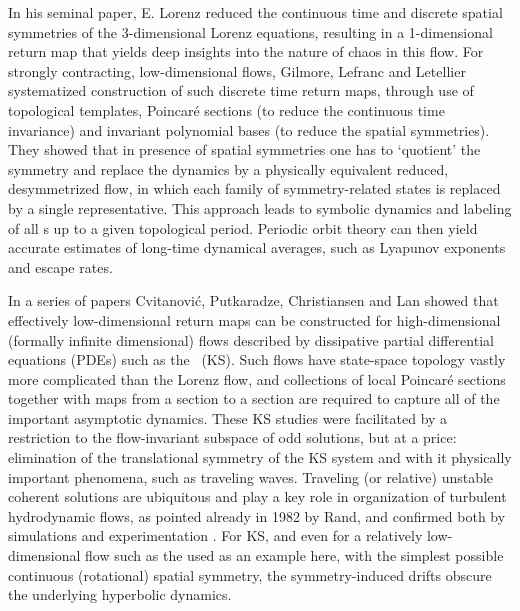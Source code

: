 \documentclass[final,number,sort&compress]{elsarticle}
\begin{document}
In his seminal paper, E. Lorenz reduced the
continuous time and discrete spatial symmetries of the
3-dimensional Lorenz equations, resulting in a 1-dimensional
return map that yields deep insights into the
nature of chaos in this flow. For strongly contracting,
low-dimensional flows, Gilmore, Lefranc and
Letellier systematized construction
of such discrete time return maps, through use of topological
templates, Poincar\'e sections (to reduce the continuous time
invariance) and in\-vari\-ant polynomial bases (to reduce the
spatial symmetries). They showed that in presence of spatial
symmetries one has to  `quotient' the symmetry and replace
the dynamics by a physically equivalent reduced,
desymmetrized flow, in which each family of symmetry-related
states is replaced by a single representative. This approach
leads to symbolic dynamics and labeling of all \po s up to a
given topological period. Periodic orbit theory can then
yield accurate estimates of long-time dynamical averages,
such as Lyapunov exponents and escape rates.

In a series of papers Cvitanovi\'{c}, Putkaradze,
Christiansen and Lan%
showed that effectively low-dimensional return maps can be
constructed for high-dimensional (formally infinite
dimensional)  flows described by dissipative partial
differential equations (PDEs) such as the \KSe\ (KS). Such
flows have state-space topology vastly more complicated than
the Lorenz flow, and collections of local Poincar\'e sections
together with maps from a section to a section are required
to capture all of the important asymptotic dynamics. These KS
studies were facilitated by a restriction to the
flow-in\-vari\-ant subspace of odd solutions, but at a price:
elimination of the translational symmetry of the KS system
and with it physically important phenomena, such as traveling
waves. Traveling (or relative) unstable coherent solutions
are ubiquitous and play a key role in organization of
turbulent hydrodynamic flows, as pointed already in
1982 by Rand, and confirmed both by
simulations and experimentation%
.
For KS, and even for a relatively
low-dimensional flow such as the
\cLe{} used as an example here, with
the simplest possible continuous (rotational) spatial
symmetry, the symmetry-induced drifts obscure the underlying
hyperbolic dynamics.
\end{document}
